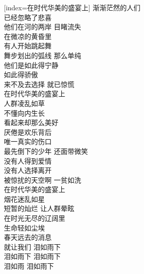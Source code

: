 \begin{songs}{}
  [index={在时代华美的盛宴上}]
	渐渐茫然的人们	\\
	已经忽略了悲喜	\\
	他们在河的两岸 目睹流失	\\
	在微凉的黄昏里	\\
	有人开始跳起舞	\\
	舞步划出的弧线 那么单纯	\\
	他们是如此得宁静	\\
	如此得骄傲	\\
	来不及去选择 就已惊慌	\\
	在时代华美的盛宴上	\\
	人群凌乱如草	\\
	不懂向内生长	\\
	看起来却那么美好	\\
	\vspace{2ex}
	厌倦是欢乐背后	\\
	唯一真实的伤口	\\
	最先倒下的少年 还面带微笑	\\
	没有人得到爱情	\\
	没有人选择离开	\\
	被惊扰的天空啊 一贫如洗	\\
	在时代华美的盛宴上	\\
	烟花迷乱如星	\\
	短暂的灿烂 让人群晕眩	\\
	在时光无尽的辽阔里	\\
	生命轻如尘埃	\\
	春天远去的消息	\\
	就让我们 泪如雨下	\\
	泪如雨下 泪如雨下	\\
	泪如雨 泪如雨下	\\
  \endsong
\end{songs}

